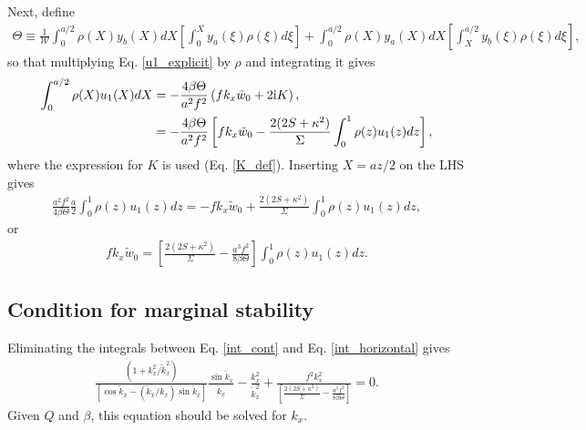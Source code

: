 \documentclass[12pt,preprint]{aastex}
\newcommand{\imgi}{\mathrm{i}}
\begin{document}
Next, define
\begin{align}
\Theta \equiv \frac{1}{\mathcal{W}}\int_0^{a/2}\rho(X)y_b(X)dX\left[\int_0^X y_a(\xi)\rho(\xi) d\xi\right] +
    \int_0^{a/2}\rho(X)y_a(X)dX
    \left[\int_X^{a/2}y_b(\xi)\rho(\xi)d\xi\right], 
\end{align}
so that multiplying Eq. \ref{u1_explicit} by $\rho$ and integrating it
gives 
\begin{align}
\int_0^{a/2}\rho(X)u_1(X)dX &= -\frac{4\beta\Theta}{a^2 f^2
  }\left(fk_x\tilde{w}_0 + 2\imgi K\right),\notag\\
&= -\frac{4\beta\Theta}{a^2 f^2
}\left[fk_x\tilde{w}_0 - \frac{2(2S +
    \kappa^2)}{\Sigma}\int_0^{1}\rho(z)u_1(z)dz\right], 
\end{align}
where the expression for $K$ is used (Eq. \ref{K_def}). Inserting $X = az/2$ on the LHS gives
\begin{align}
  \frac{a^2f^2}{4\beta\Theta}\frac{a}{2}\int_0^1\rho(z)u_1(z)dz = -
  fk_x\tilde{w}_0 +
  \frac{2(2S+\kappa^2)}{\Sigma}\int_0^1\rho(z)u_1(z)dz, 
\end{align}
or
\begin{align}
  fk_x\tilde{w}_0 = \left[\frac{2(2S + \kappa^2)}{\Sigma} -
    \frac{a^3f^2}{8\beta\Theta}\right]\int_0^1\rho(z)u_1(z)dz. \label{int_horizontal}
\end{align}

\subsection{Condition for marginal stability}
Eliminating the integrals between Eq. \ref{int_cont} and
Eq. \ref{int_horizontal} gives
\begin{align}
   \frac{\left(1 +
    k_x^2/\tilde{k}_x^2\right)}{\left[\cos{\tilde{k}_x} -
    \left(\tilde{k}_x/k_x\right)\sin{\tilde{k}_x}\right]}\frac{\sin{\tilde{k}_x}}{\tilde{k}_x} -
  \frac{k_x^2}{\tilde{k}_x^2} + \frac{f^2k_x^2
    }{\left[\frac{2(2S + \kappa^2)}{\Sigma} -
    \frac{a^3f^2}{8\beta\Theta}\right]} = 0.
\end{align}
Given $Q$ and $\beta$, this equation should be solved for $k_x$. 

%
%
%
%
%
%
%
\end{document}
